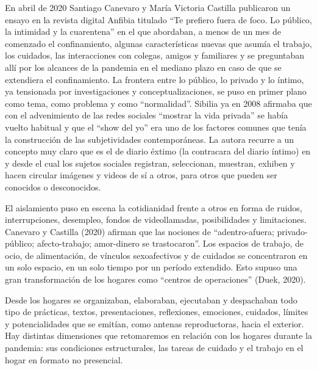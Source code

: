 En abril de 2020 Santiago Canevaro y María Victoria Castilla publicaron un ensayo en la revista digital Anfibia titulado ``Te prefiero fuera de foco. Lo público, la intimidad y la cuarentena'' en el que abordaban, a menos de un mes de comenzado el confinamiento, algunas características nuevas que asumía el trabajo, los cuidados, las interacciones con colegas, amigos y familiares y se preguntaban allí por los alcances de la pandemia en el mediano plazo en caso de que se extendiera el confinamiento. La frontera entre lo público, lo privado y lo íntimo, ya tensionada por investigaciones y conceptualizaciones, se puso en primer plano como tema, como problema y como ``normalidad''. Sibilia ya en 2008 afirmaba que con el advenimiento de las redes sociales ``mostrar la vida privada'' se había vuelto habitual y que el ``show del yo'' era uno de los factores comunes que tenía la construcción de las subjetividades contemporáneas. La autora recurre a un concepto muy claro que es el de diario éxtimo (la contracara del diario íntimo) en y desde el cual los sujetos sociales registran, seleccionan, muestran, exhiben y hacen circular imágenes y videos de sí a otros, para otros que pueden ser conocidos o desconocidos.

El aislamiento puso en escena la cotidianidad frente a otros en forma de ruidos, interrupciones, desempleo, fondos de videollamadas, posibilidades y limitaciones. Canevaro y Castilla (2020) afirman que las nociones de ``adentro-afuera; privado-público; afecto-trabajo; amor-dinero se trastocaron''. Los espacios de trabajo, de ocio, de alimentación, de vínculos sexoafectivos y de cuidados se concentraron en un solo espacio, en un solo tiempo por un período extendido. Esto supuso una gran transformación de los hogares como ``centros de operaciones'' (Duek, 2020).

Desde los hogares se organizaban, elaboraban, ejecutaban y despachaban todo tipo de prácticas, textos, presentaciones, reflexiones, emociones, cuidados, límites y potencialidades que se emitían, como antenas reproductoras, hacia el exterior. Hay distintas dimensiones que retomaremos en relación con los hogares durante la pandemia: sus condiciones estructurales, las tareas de cuidado y el trabajo en el hogar en formato no presencial.

